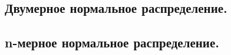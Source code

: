 \subsection{Двумерное нормальное распределение.}



\newpage
\subsection{n-мерное нормальное распределение.}

